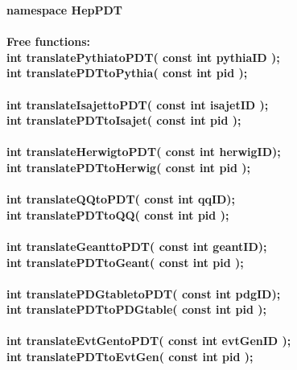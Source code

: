 \documentclass[twoside,12pt]{article}
\begin{document}
\begin{tabbing}

{\bf namespace HepPDT} \\  \\

{\bf Free functions:} \\
\hspace{0.5in} {\bf int translatePythiatoPDT( const int pythiaID );} \\
\hspace{0.5in} {\bf int translatePDTtoPythia( const int pid );} \\  \\

\hspace{0.5in} {\bf int translateIsajettoPDT( const int isajetID );} \\
\hspace{0.5in} {\bf int translatePDTtoIsajet( const int pid );} \\  \\

\hspace{0.5in} {\bf int translateHerwigtoPDT( const int herwigID);} \\
\hspace{0.5in} {\bf int translatePDTtoHerwig( const int pid );} \\  \\

\hspace{0.5in} {\bf int translateQQtoPDT( const int qqID);} \\
\hspace{0.5in} {\bf int translatePDTtoQQ( const int pid );} \\  \\

\hspace{0.5in} {\bf int translateGeanttoPDT( const int geantID);} \\
\hspace{0.5in} {\bf int translatePDTtoGeant( const int pid );} \\  \\

\hspace{0.5in} {\bf int translatePDGtabletoPDT( const int pdgID);} \\
\hspace{0.5in} {\bf int translatePDTtoPDGtable( const int pid );} \\  \\

\hspace{0.5in} {\bf int translateEvtGentoPDT( const int evtGenID );} \\
\hspace{0.5in} {\bf int translatePDTtoEvtGen( const int pid );} \\  \\

\end{tabbing}
\end{document}
